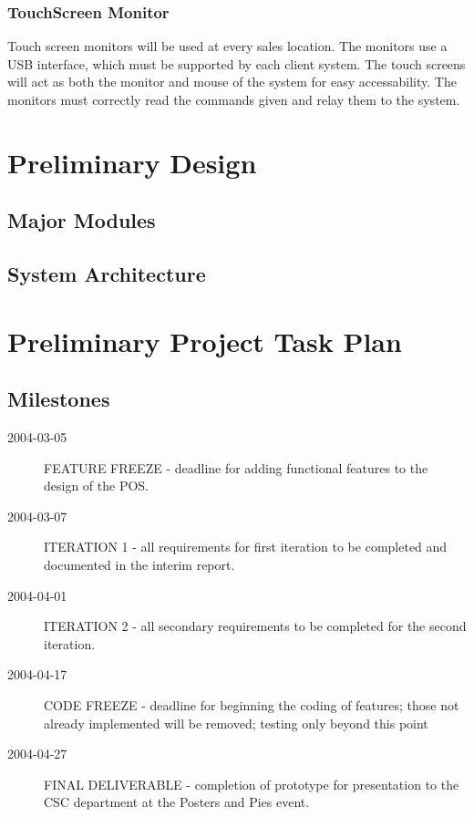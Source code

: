 \documentclass{report}
\begin{document}
    \subsubsection{TouchScreen Monitor}
    Touch screen monitors will be used at every sales location.
    The monitors use a USB interface, which must be supported by
    each client system.  The touch screens will act as both the
    monitor and mouse of the system for easy accessability.  The
    monitors must correctly read the commands given and relay them
    to the system.

\section{Preliminary Design}

    \subsection{Major Modules}

    \subsection{System Architecture}

\section{Preliminary Project Task Plan}

    \subsection{Milestones}
    \begin{description}
        \item[2004-03-05] FEATURE FREEZE - deadline for adding functional
        features to the design of the POS.
        \item[2004-03-07] ITERATION 1 - all requirements for first
        iteration to be completed and documented in the interim
        report.
        \item[2004-04-01] ITERATION 2 - all secondary requirements
        to be completed for the second iteration.
        \item[2004-04-17] CODE FREEZE - deadline for beginning the
        coding of features; those not already implemented will be removed;
        testing only beyond this point
        \item[2004-04-27] FINAL DELIVERABLE - completion of
        prototype for presentation to the CSC department at the
        Posters and Pies event.
    \end{description}
\end{document}
